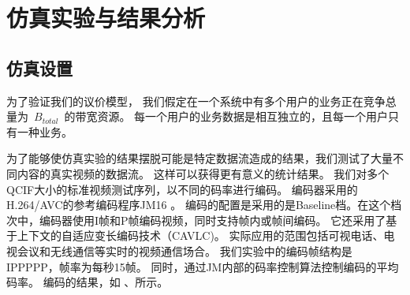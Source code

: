 \section{仿真实验与结果分析}
\subsection{仿真设置}
为了验证我们的议价模型，
我们假定在一个系统中有多个用户的业务正在竞争总量为~$B_{total}$~的带宽资源。
每一个用户的业务数据是相互独立的，且每一个用户只有一种业务。

为了能够使仿真实验的结果摆脱可能是特定数据流造成的结果，我们测试了大量不同内容的真实视频的数据流。
这样可以获得更有意义的统计结果。
 我们对多个QCIF大小的标准视频测试序列，以不同的码率进行编码。
编码器采用的H.264/AVC的参考编码程序JM16 \cite{h_264_codec}。
编码的配置是采用的是Baseline档。在这个档次中，编码器使用I帧和P帧编码视频，同时支持帧内或帧间编码。
它还采用了基于上下文的自适应变长编码技术（CAVLC)。
实际应用的范围包括可视电话、电视会议和无线通信等实时的视频通信场合\cite{BiHouJie2009}。
我们实验中的编码帧结构是IPPPPP，帧率为每秒15帧。
同时，通过JM内部的码率控制算法控制编码的平均码率。
编码的结果，如 、所示。
